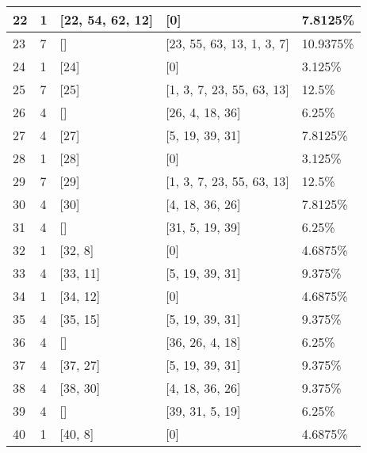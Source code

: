 \documentclass[10pt,a4paper]{article}
\begin{document}
\begin{enumerate}
\begin{table}[H]
\begin{tabular}{|l|l|l|l|l|}
		22 & 1 & [22, 54, 62, 12] & [0] & 7.8125\%\\ \hline 
		23 & 7 & [] & [23, 55, 63, 13, 1, 3, 7] & 10.9375\%\\ \hline 
		24 & 1 & [24] & [0] & 3.125\%\\ \hline 
		25 & 7 & [25] & [1, 3, 7, 23, 55, 63, 13] & 12.5\%\\ \hline 
		26 & 4 & [] & [26, 4, 18, 36] & 6.25\%\\ \hline 
		27 & 4 & [27] & [5, 19, 39, 31] & 7.8125\%\\ \hline 
		28 & 1 & [28] & [0] & 3.125\%\\ \hline 
		29 & 7 & [29] & [1, 3, 7, 23, 55, 63, 13] & 12.5\%\\ \hline 
		30 & 4 & [30] & [4, 18, 36, 26] & 7.8125\%\\ \hline 
		31 & 4 & [] & [31, 5, 19, 39] & 6.25\%\\ \hline 
		32 & 1 & [32, 8] & [0] & 4.6875\%\\ \hline 
		33 & 4 & [33, 11] & [5, 19, 39, 31] & 9.375\%\\ \hline 
		34 & 1 & [34, 12] & [0] & 4.6875\%\\ \hline 
		35 & 4 & [35, 15] & [5, 19, 39, 31] & 9.375\%\\ \hline 
		36 & 4 & [] & [36, 26, 4, 18] & 6.25\%\\ \hline 
		37 & 4 & [37, 27] & [5, 19, 39, 31] & 9.375\%\\ \hline 
		38 & 4 & [38, 30] & [4, 18, 36, 26] & 9.375\%\\ \hline 
		39 & 4 & [] & [39, 31, 5, 19] & 6.25\%\\ \hline 
		40 & 1 & [40, 8] & [0] & 4.6875\%\\ \hline 
		
	\end{tabular}
\end{table}



\end{enumerate}
\end{document}
